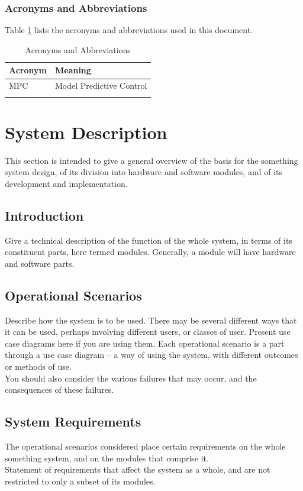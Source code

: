 \documentclass[11pt,a4paper]{article}
\begin{document}
\subsubsection{Acronyms and Abbreviations}
Table \ref{Acro} lists the acronyms and abbreviations used in this document.
\begin{table}[h]
\centering
\caption{Acronyms and Abbreviations}
\label{Acro}
\begin{tabular}{|l|l|}
\hline Acronym & Meaning \\
\hline MPC & Model Predictive Control \\
\hline & \\
\hline
\end{tabular}
\end{table}

\section{System Description}
This section is intended to give a general overview of the basis for the something system design, of its division into hardware and software modules, and of its development and implementation.  
\subsection{Introduction}
Give a technical description of the function of the whole system, in terms of its constituent parts, here termed modules. Generally, a module will have hardware and software parts.
\subsection{Operational Scenarios}
Describe how the system is to be used. There may be several different ways that it can be used, perhaps involving different users, or classes of user. Present use case diagrams here if you are using them. Each operational scenario is a part through a use case diagram – a way of using the system, with different outcomes or methods of use. \\
You should also consider the various failures that may occur, and the consequences of these failures.

\subsection{System Requirements}
The operational scenarios considered place certain requirements on the whole something system, and on the modules that comprise it.\\
Statement of requirements that affect the system as a whole, and are not restricted to only a subset of its modules.
\end{document}
